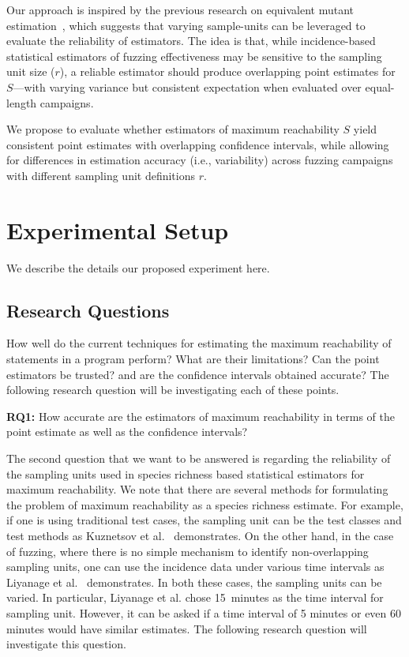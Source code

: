 \documentclass[conference,anonymous,review]{IEEEtran}
\begin{document}
Our approach is inspired by the previous research on equivalent mutant
estimation~\cite{Kuznetsov2024empirical}, which suggests that varying
sample-units can be leveraged to evaluate the reliability of estimators.
The idea is that, while incidence-based statistical estimators of
fuzzing effectiveness may be sensitive to the sampling unit size ($r$),
a reliable estimator should produce overlapping point estimates for $S$—with
varying variance but consistent expectation when evaluated over equal-length
campaigns.

We propose to evaluate whether estimators of maximum reachability $S$ yield
consistent point estimates with overlapping confidence intervals, while allowing
for differences in estimation accuracy (i.e., variability) across fuzzing
campaigns with different sampling unit definitions $r$.

\section{Experimental Setup}
\label{sec:setup}
We describe the details our proposed experiment here.
\subsection{Research Questions}
How well do the current techniques for estimating the maximum reachability
of statements in a program perform? What are their limitations? Can the
point estimators be trusted? and are the confidence intervals obtained accurate?
The following research question will be investigating each of these points.

\noindent\textbf{RQ1:} How accurate are the estimators of maximum reachability
in terms of the point estimate as well as the confidence intervals?

The second question that we want to be answered is regarding the reliability
of the sampling units used in species richness based statistical estimators for
maximum reachability. We note that there are several methods for formulating
the problem of maximum reachability as a species richness estimate. For example,
if one is using traditional test cases, the sampling unit can be the test
classes and test methods as Kuznetsov et al.~\cite{Kuznetsov2024empirical}
demonstrates. On the other hand, in the case of fuzzing, where there is no
simple mechanism to identify non-overlapping sampling units, one can use the
incidence data under various time intervals as
Liyanage et al.~\cite{liyanage2021security} demonstrates. In both these cases, the
sampling units can be varied. In particular, Liyanage et al. chose 15~minutes
as the time interval for sampling unit. However, it can be asked if a time
interval of 5 minutes or even 60 minutes would have similar estimates.
The following research question will investigate this question.
\end{document}
